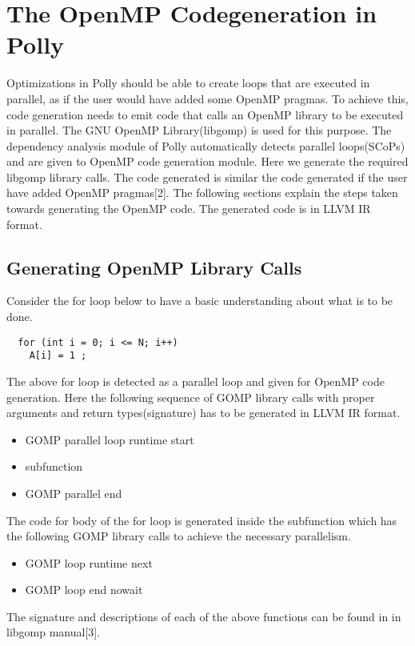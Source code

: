 \documentclass[a4paper,12pt]{book}
\begin{document}
\chapter{The OpenMP Codegeneration in Polly}

Optimizations in Polly should be able to create loops that are executed in parallel, as if the user would have
added some OpenMP pragmas. To achieve this, code generation needs to emit code that calls an OpenMP
library to be executed in parallel. The GNU OpenMP Library(libgomp) is used for this purpose. The
dependency analysis module of Polly automatically detects parallel loops(SCoPs) and are given to OpenMP
code generation module. Here we generate the required libgomp library calls. The code generated is similar
the code generated if the user have added OpenMP pragmas[2]. The following sections explain the steps
taken towards generating the OpenMP code. The generated code is in LLVM IR format.
\section{Generating OpenMP Library Calls}
Consider the for loop below to have a basic understanding about what is to be done.

{\footnotesize
\begin{lstlisting}
  for (int i = 0; i <= N; i++)
    A[i] = 1 ;
\end{lstlisting}
}

The above for loop is detected as a parallel loop and given for OpenMP code generation. Here the following
sequence of GOMP library calls with proper arguments and return types(signature) has to be generated in
LLVM IR format.

\begin{itemize}
\item GOMP parallel loop runtime start
\item subfunction
\item GOMP parallel end
\end{itemize}

The code for body of the for loop is generated inside the subfunction which has the following GOMP library
calls to achieve the necessary parallelism.

\begin{itemize}
\item GOMP loop runtime next
\item GOMP loop end nowait
\end{itemize}

The signature and descriptions of each of the above functions can be found in in libgomp manual[3].
\end{document}
